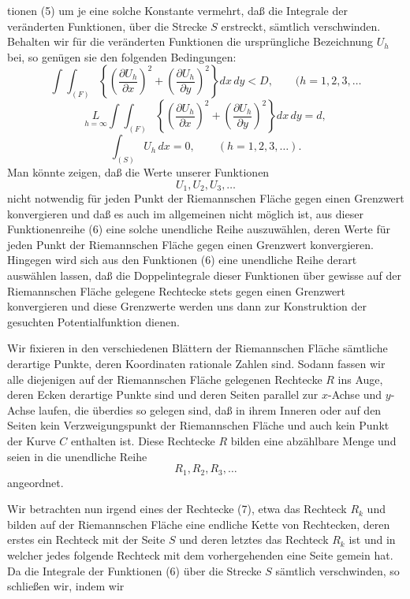 \documentclass{article}
\begin{document}
tionen (5) um je eine solche Konstante vermehrt, daß die Integrale der veränderten Funktionen, über die Strecke $S$ erstreckt, sämtlich verschwinden. Behalten wir für die veränderten Funktionen die ursprüngliche Bezeichnung $U_h$ bei, so genügen sie den folgenden Bedingungen:
\[
\int\!\!\int_{(F)} \left\{ \left(\frac{\partial U_h}{\partial x}\right)^2 + \left(\frac{\partial U_h}{\partial y}\right)^2 \right\} dx\,dy < D, \qquad (h = 1, 2, 3, \dots
\]
\[
\underset{h=\infty}{L} \int\!\!\int_{(F)} \left\{ \left(\frac{\partial U_h}{\partial x}\right)^2 + \left(\frac{\partial U_h}{\partial y}\right)^2 \right\} dx\,dy = d,
\]
\[
\int_{(S)} U_h\,dx = 0, \qquad (h = 1, 2, 3, \dots).
\]
Man könnte zeigen, daß die Werte unserer Funktionen
\[
U_1, U_2, U_3, \dots \tag{6}
\]
nicht notwendig für jeden Punkt der Riemannschen Fläche gegen einen Grenzwert konvergieren und daß es auch im allgemeinen nicht möglich ist, aus dieser Funktionenreihe (6) eine solche unendliche Reihe auszuwählen, deren Werte für jeden Punkt der Riemannschen Fläche gegen einen Grenzwert konvergieren. Hingegen wird sich aus den Funktionen (6) eine unendliche Reihe derart auswählen lassen, daß die Doppelintegrale dieser Funktionen über gewisse auf der Riemannschen Fläche gelegene Rechtecke stets gegen einen Grenzwert konvergieren und diese Grenzwerte werden uns dann zur Konstruktion der gesuchten Potentialfunktion dienen.

Wir fixieren in den verschiedenen Blättern der Riemannschen Fläche sämtliche derartige Punkte, deren Koordinaten rationale Zahlen sind. Sodann fassen wir alle diejenigen auf der Riemannschen Fläche gelegenen Rechtecke $R$ ins Auge, deren Ecken derartige Punkte sind und deren Seiten parallel zur $x$-Achse und $y$-Achse laufen, die überdies so gelegen sind, daß in ihrem Inneren oder auf den Seiten kein Verzweigungspunkt der Riemannschen Fläche und auch kein Punkt der Kurve $C$ enthalten ist. Diese Rechtecke $R$ bilden eine abzählbare Menge und seien in die unendliche Reihe
\[
R_1, R_2, R_3, \dots \tag{7}
\]
angeordnet.

Wir betrachten nun irgend eines der Rechtecke (7), etwa das Rechteck $R_k$ und bilden auf der Riemannschen Fläche eine endliche Kette von Rechtecken, deren erstes ein Rechteck mit der Seite $S$ und deren letztes das Rechteck $R_k$ ist und in welcher jedes folgende Rechteck mit dem vorhergehenden eine Seite gemein hat. Da die Integrale der Funktionen (6) über die Strecke $S$ sämtlich verschwinden, so schließen wir, indem wir
\end{document}
